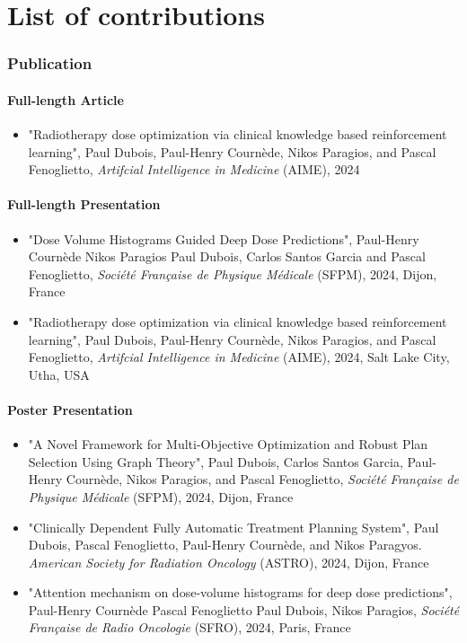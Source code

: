 \chapter*{List of contributions}
\subsection*{Publication}
\subsubsection*{Full-length Article}
\begin{itemize}
	\item "Radiotherapy dose optimization via clinical knowledge based reinforcement learning",
	Paul Dubois, Paul-Henry Cournède, Nikos Paragios, and Pascal Fenoglietto,
	\textit{Artifcial Intelligence in Medicine} (AIME), 2024
\end{itemize}

\subsubsection*{Full-length Presentation}
\begin{itemize}
	\item "Dose Volume Histograms Guided Deep Dose Predictions",
	Paul-Henry Cournède Nikos Paragios Paul Dubois, Carlos Santos Garcia and Pascal Fenoglietto,
	\textit{Société Française de Physique Médicale} (SFPM), 2024, Dijon, France
	
	\item "Radiotherapy dose optimization via clinical knowledge based reinforcement learning",
	Paul Dubois, Paul-Henry Cournède, Nikos Paragios, and Pascal Fenoglietto,
	\textit{Artifcial Intelligence in Medicine} (AIME), 2024, Salt Lake City, Utha, USA
\end{itemize}

\subsubsection*{Poster Presentation}
\begin{itemize}
	\item "A Novel Framework for Multi-Objective Optimization and Robust Plan Selection Using Graph Theory",
	Paul Dubois, Carlos Santos Garcia, Paul-Henry Cournède, Nikos Paragios, and Pascal Fenoglietto,
	\textit{Société Française de Physique Médicale} (SFPM), 2024, Dijon, France
	
	\item "Clinically Dependent Fully Automatic Treatment Planning System",
	Paul Dubois, Pascal Fenoglietto, Paul-Henry Cournède, and Nikos Paragyos.
	\textit{American Society for Radiation Oncology} (ASTRO), 2024, Dijon, France
	
	\item "Attention mechanism on dose-volume histograms for deep dose predictions",
	Paul-Henry Cournède Pascal Fenoglietto Paul Dubois, Nikos Paragios,
	\textit{Société Française de Radio Oncologie} (SFRO), 2024, Paris, France
\end{itemize}

